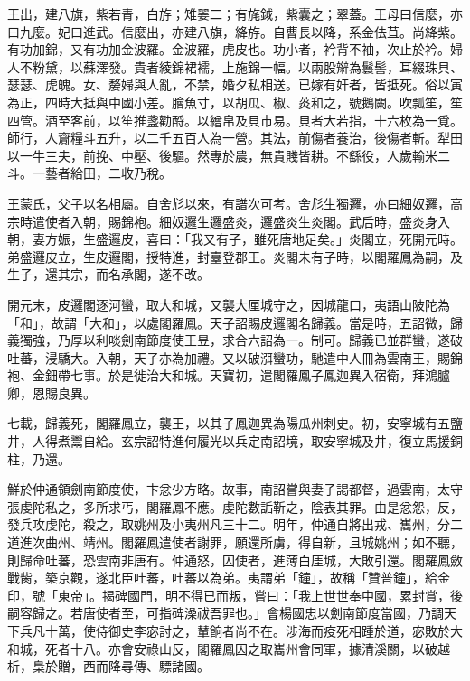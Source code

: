 \begin{pinyinscope}
 王出，建八旗，紫若青，白斿；雉翣二；有旄鉞，紫囊之；翠蓋。王母曰信麼，亦曰九麼。妃曰進武。信麼出，亦建八旗，絳斿。自曹長以降，系金佉苴。尚絳紫。有功加錦，又有功加金波羅。金波羅，虎皮也。功小者，衿背不袖，次止於衿。婦人不粉黛，以蘇澤發。貴者綾錦裙襦，上施錦一幅。以兩股辮為鬟髻，耳綴珠貝、瑟瑟、虎魄。女、嫠婦與人亂，不禁，婚夕私相送。已嫁有奸者，皆抵死。俗以寅為正，四時大抵與中國小差。膾魚寸，以胡瓜、椒、菼和之，號鵝闕。吹瓢笙，笙四管。酒至客前，以笙推盞勸酹。以繒帛及貝市易。貝者大若指，十六枚為一覓。師行，人齎糧斗五升，以二千五百人為一營。其法，前傷者養治，後傷者斬。犁田以一牛三夫，前挽、中壓、後驅。然專於農，無貴賤皆耕。不繇役，人歲輸米二斗。一藝者給田，二收乃稅。



 王蒙氏，父子以名相屬。自舍尨以來，有譜次可考。舍尨生獨邏，亦曰細奴邏，高宗時遣使者入朝，賜錦袍。細奴邏生邏盛炎，邏盛炎生炎閣。武后時，盛炎身入朝，妻方娠，生盛邏皮，喜曰：「我又有子，雖死唐地足矣。」炎閣立，死開元時。弟盛邏皮立，生皮邏閣，授特進，封臺登郡王。炎閣未有子時，以閣羅鳳為嗣，及生子，還其宗，而名承閣，遂不改。



 開元末，皮邏閣逐河蠻，取大和城，又襲大厘城守之，因城龍口，夷語山陂陀為「和」，故謂「大和」，以處閣羅鳳。天子詔賜皮邏閣名歸義。當是時，五詔微，歸義獨強，乃厚以利啖劍南節度使王昱，求合六詔為一。制可。歸義已並群蠻，遂破吐蕃，浸驕大。入朝，天子亦為加禮。又以破渳蠻功，馳遣中人冊為雲南王，賜錦袍、金鈿帶七事。於是徙治大和城。天寶初，遣閣羅鳳子鳳迦異入宿衛，拜鴻臚卿，恩賜良異。



 七載，歸義死，閣羅鳳立，襲王，以其子鳳迦異為陽瓜州刺史。初，安寧城有五鹽井，人得煮鬻自給。玄宗詔特進何履光以兵定南詔境，取安寧城及井，復立馬援銅柱，乃還。



 鮮於仲通領劍南節度使，卞忿少方略。故事，南詔嘗與妻子謁都督，過雲南，太守張虔陀私之，多所求丐，閣羅鳳不應。虔陀數詬靳之，陰表其罪。由是忿怨，反，發兵攻虔陀，殺之，取姚州及小夷州凡三十二。明年，仲通自將出戎、巂州，分二道進次曲州、靖州。閣羅鳳遣使者謝罪，願還所虜，得自新，且城姚州；如不聽，則歸命吐蕃，恐雲南非唐有。仲通怒，囚使者，進薄白厓城，大敗引還。閣羅鳳斂戰胔，築京觀，遂北臣吐蕃，吐蕃以為弟。夷謂弟「鐘」，故稱「贊普鐘」，給金印，號「東帝」。揭碑國門，明不得已而叛，嘗曰：「我上世世奉中國，累封賞，後嗣容歸之。若唐使者至，可指碑澡祓吾罪也。」會楊國忠以劍南節度當國，乃調天下兵凡十萬，使侍御史李宓討之，輦餉者尚不在。涉海而疫死相踵於道，宓敗於大和城，死者十八。亦會安祿山反，閣羅鳳因之取巂州會同軍，據清溪關，以破越析，梟於贈，西而降尋傳、驃諸國。




\end{pinyinscope}
